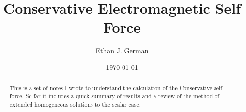 \documentclass[preprint,showpacs,preprintnumbers,amssymb,superscriptaddress,aps,prd,nofootinbib,11pt]{revtex4-1}
\begin{document}
\preprint{}

 \title{Conservative Electromagnetic Self Force}


\author{Ethan J. German}
\date{\today}

\begin{abstract}
    This is a set of notes I wrote to understand the calculation of the Conservative self force. So far it includes a quick summary of results and a review of the method of extended homogeneous solutions to the scalar case.
\end{abstract}

\maketitle
\end{document}

